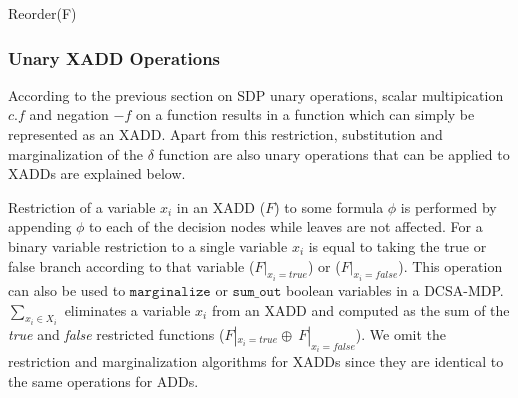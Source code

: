 \documentclass[twoside,11pt]{article}
\begin{document}
\begin{algorithm}[t!]

\BlankLine
{}
\caption{{\sc Reorder}(F)  \label{alg:reorder}}
\end{algorithm}
\subsubsection{Unary XADD Operations}
According to the previous section on SDP unary operations, scalar multipication $c.f$ and negation $- f$ on a function results in a function which can simply be represented as an XADD. Apart from this restriction, substitution and marginalization of the $\delta$ function are also unary operations that can be applied to XADDs are explained below.  

Restriction of a variable $x_i$ in an XADD ($F$) to some formula $\phi$ is performed by appending $\phi$ to each of the decision nodes while leaves are not affected. %
For a binary variable restriction to a single variable $x_i$ is equal to taking the true or false branch according to that variable 
($F|_{x_i=true}$) or ($F|_{x_i=false}$). 
This operation can also be used to $\texttt{marginalize}$ or $\texttt{sum\_out}$ boolean variables in a DCSA-MDP. 
$\sum_{x_i \in X_i}$ eliminates a variable $x_i$ from an XADD and computed as the sum of the \emph{true} and \emph{false} restricted functions ($F|_{x_i=true} \oplus \ F|_{x_i=false}$). We omit the restriction and marginalization algorithms for XADDs since they are identical to the same operations for ADDs. 
\end{document}
